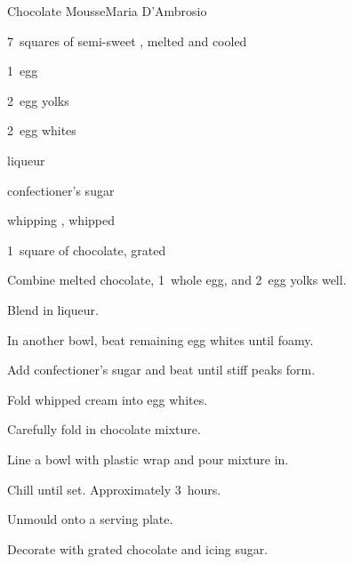 \begin{recipe}{Chocolate Mousse}{Maria D'Ambrosio}{}

\begin{ingredients}
\item 7~squares of semi-sweet , melted and cooled
\item 1~egg
\item 2~egg yolks
\item 2~egg whites
\item {} liqueur
\item {} confectioner's sugar
\item {} whipping , whipped
\item 1~square of chocolate, grated
\end{ingredients}

\begin{directions}
\item Combine melted chocolate, 1~whole egg, and 2~egg yolks well.
\item Blend in liqueur.
\item In another bowl, beat remaining egg whites until foamy.
\item Add confectioner's sugar and beat until stiff peaks form.
\item Fold whipped cream into egg whites.
\item Carefully fold in chocolate mixture.
\item Line a  bowl with plastic wrap and pour mixture in.
\item Chill until set. Approximately 3~hours.
\item Unmould onto a serving plate.
\item Decorate with grated chocolate and icing sugar.
\end{directions}

\end{recipe}
